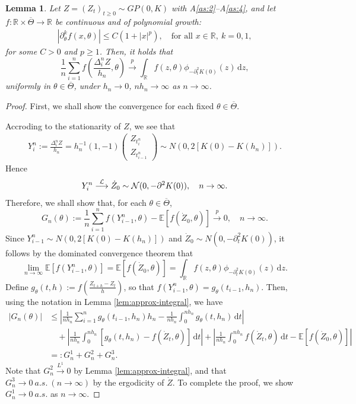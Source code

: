 \documentclass[a4paper,10pt,twoside]{article}
\newtheorem{lem}{Lemma}[section]
\numberwithin{equation}{section}
\def\R{\mathbb{R}}
\def\l{\left}
\def\r{\right}
\def\th{\theta}
\def\p{\partial}
\def\toP{\stackrel{p}{\longrightarrow}}
\def\toD{\stackrel{{\cal L}}{\longrightarrow}}
\def\E{\mathbb{E}}
\def\ol#1{\overline{#1}}
\def\df{\mathrm{d}}
\begin{document}
\begin{lem}\label{lem:avg-conv}
Let $Z = (Z_t)_{t \ge 0} \sim GP(0,K)$ with A\ref{as:2}--A\ref{as:4}, and let $f:\mathbb{R}\times \ol{\Theta} \to \mathbb{R}$ be continuous and of polynomial growth:
\begin{align*}
|\p_\th^k f(x,\th)| \le C(1 + |x|^p), \quad \text{for all } x \in \mathbb{R},\ k=0,1, %
\end{align*}
for some $C>0$ and $p \ge 1$. Then, it holds that 
\[
\frac{1}{n} \sum_{i=1}^n f\l( \frac{\Delta_i^n Z}{h_n} ,\th \r) \toP \int_\R f(z,\th)\phi_{-\p^2_t K(0)}(z)\,\df z, 
\]
uniformly in $\th\in \ol{\Theta}$, under $h_n \to 0$, $n h_n \to \infty$ as $n \to \infty$. 
\end{lem}

\begin{proof}
First, we shall show the convergence for each fixed $\th\in \ol{\Theta}$. 

Accroding to the stationarity of $Z$, we see that 
\begin{align*}
Y_i^n := \frac{\Delta_i^n Z}{h_n} = h_n^{-1} (1 , -1)\begin{pmatrix}Z_{t_i^n} \\ Z_{t_{i-1}^n} \end{pmatrix} \sim N\l(0, 2[K(0) - K(h_n)]\r). 
\end{align*}
Hence 
\begin{align*}
Y_i^n \toD \dot{Z}_0 \sim {\cal N}(0, -\partial^2 K(0)),\quad n\to \infty. 
\end{align*}
Therefore, we shall show that, for each $\th\in \ol{\Theta}$, 
\[
G_n(\th):=\frac{1}{n}\sum_{i=1}^n f(Y_{i-1}^n,\th)  - \E[f(\dot{Z}_0,\th)] \toP 0,\quad n\to \infty.
\]
Since $Y_{i-1}^n  \sim N\l(0, 2[K(0) - K(h_n)]\r)$ and $\dot{Z}_0 \sim N\l(0,-\p^2_t K(0)\r)$, it follows by the dominated convergence theorem that 
\[
\lim_{n \to \infty} \E[f(Y_{i-1}^n,\th)] = \E[f(\dot{Z}_0,\th)] = \int_\R f(z,\th)\phi_{-\p^2_t K(0)}(z)\,\df z.
\]
Define $g_\th(t,h) := f\l( \frac{Z_{t+h} - Z_t}{h} \r)$, so that $f(Y_{i-1}^n,\th) = g_\th(t_{i-1},h_n)$. 
Then, using the notation in Lemma \ref{lem:approx-integral}, we have
\begin{align*}
\l|G_n(\th)\r| &\le \l|\frac{1}{nh_n}\sum_{i=1}^n g_\th(t_{i-1},h_n) h_n - \frac{1}{nh_n}\int_0^{nh_n} g_\th(t,h_n)\,\df t \r|\\
&\quad + \l|\frac{1}{nh_n}\int_0^{nh_n} \l[ g_\th(t,h_n) - f(\dot{Z}_t,\th) \r]\,\df t \r| + \l|\frac{1}{nh_n}\int_0^{nh_n}f(\dot{Z}_t,\th)\,\df t -  \E[f(\dot{Z}_0,\th)]\r|\\
& =: G_n^1 + G_n^2+ G_n^3. 
\end{align*}
Note that $G_n^2\stackrel{L^1}{\longrightarrow} 0$ by Lemma \ref{lem:approx-integral}, and that $G_n^3 \to 0\ a.s.\ (n\to \infty)$ by the ergodicity of $\dot{Z}$.  
To complete the proof, we show $G_n^1 \to 0\ a.s.$ as $n \to \infty$. 


\end{proof}
\end{document}

